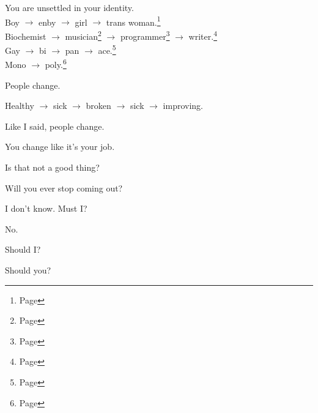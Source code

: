 \label{ally:18}
\begin{paracol}{2}
  \begin{leftcolumn}

\begin{ally}
You are unsettled in your identity.\\
Boy $\rightarrow$ enby $\rightarrow$ girl $\rightarrow$ trans woman.\footnote{Page \pageref{gender:gender}}\\
Biochemist $\rightarrow$ musician\footnote{Page \pageref{writing:music}} $\rightarrow$ programmer\footnote{Page \pageref{writing:software}} $\rightarrow$ writer.\footnote{Page \pageref{writing:writing}}\\
Gay $\rightarrow$ bi $\rightarrow$ pan $\rightarrow$ ace.\footnote{Page \pageref{sex:sex}}\\
Mono $\rightarrow$ poly.\footnote{Page \pageref{poly}}
\end{ally}
People change.

\begin{ally}
Healthy $\rightarrow$ sick $\rightarrow$ broken $\rightarrow$ sick $\rightarrow$ improving.
\end{ally}
Like I said, people change.

\begin{ally}
You change like it's your job.
\end{ally}
Is that not a good thing?

\begin{ally}
Will you ever stop coming out?
\end{ally}
I don't know. Must I?

\begin{ally}
No.
\end{ally}
Should I?

\begin{ally}
Should you?
\end{ally}
\newpage

\end{leftcolumn}
\end{paracol}
